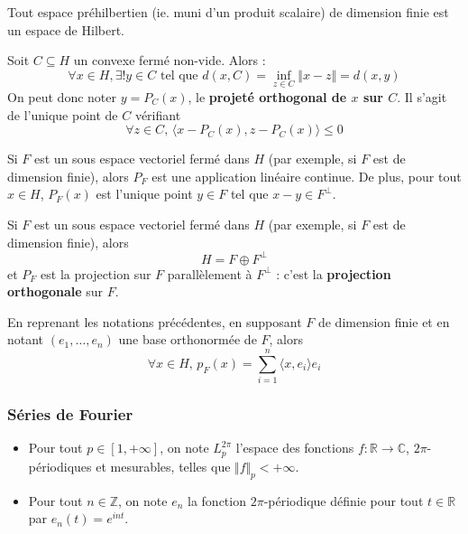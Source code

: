   \begin{example}
    Tout espace préhilbertien (ie. muni d'un produit scalaire) de dimension finie est un espace de Hilbert.
  \end{example}

  \begin{theorem}
    Soit $C \subseteq H$ un convexe fermé non-vide. Alors :
    \[ \forall x \in H, \exists! y \in C \text{ tel que } d(x, C) = \inf_{z \in C} \Vert x - z \Vert = d(x, y) \]
    On peut donc noter $y = P_C(x)$, le \textbf{projeté orthogonal de $x$ sur $C$}. Il s'agit de l'unique point de $C$ vérifiant
    \[ \forall z \in C, \, \langle x - P_C(x), z - P_C(x) \rangle \leq 0 \]
  \end{theorem}

  \begin{theorem}
    Si $F$ est un sous espace vectoriel fermé dans $H$ (par exemple, si $F$ est de dimension finie), alors $P_F$ est une application linéaire continue. De plus, pour tout $x \in H$, $P_F(x)$ est l'unique point $y \in F$ tel que $x-y \in F^\perp$.
  \end{theorem}

  \begin{theorem}
    Si $F$ est un sous espace vectoriel fermé dans $H$ (par exemple, si $F$ est de dimension finie), alors
    \[ H = F \oplus F^\perp \]
    et $P_F$ est la projection sur $F$ parallèlement à $F^\perp$ : c'est la \textbf{projection orthogonale} sur $F$.
  \end{theorem}


  \begin{remark}
    En reprenant les notations précédentes, en supposant $F$ de dimension finie et en notant $(e_1, \dots, e_n)$ une base orthonormée de $F$, alors
    \[ \forall x \in H, \, p_F(x) = \sum_{i=1}^{n} \langle x, e_i \rangle e_i \]
  \end{remark}

  \subsubsection{Séries de Fourier}


  \begin{notation}
    \begin{itemize}
      \item Pour tout $p \in [1, +\infty]$, on note $L_p^{2\pi}$ l'espace des fonctions $f : \mathbb{R} \rightarrow \mathbb{C}$, $2\pi$-périodiques et mesurables, telles que $\Vert f \Vert_p < +\infty$.
      \item Pour tout $n \in \mathbb{Z}$, on note $e_n$ la fonction $2\pi$-périodique définie pour tout $t \in \mathbb{R}$ par $e_n(t) = e^{int}$.
    \end{itemize}
  \end{notation}

